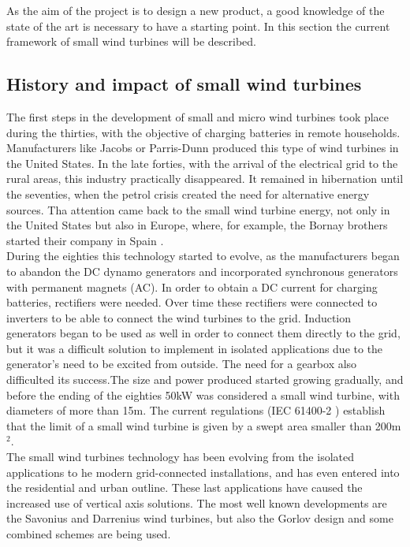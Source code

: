 \documentclass[../TFG_Report.tex]{subfiles}
\begin{document}
	
As the aim of the project is to design a new product, a good knowledge of the state of the art is necessary to have a starting point. In this section the current framework of small wind turbines will be described. 
	
\subsection{History and impact of small wind turbines}

The first steps in the development of small and micro wind turbines took place during the thirties, with the objective of charging batteries in remote households. Manufacturers like Jacobs \cite{Jacobs} or Parris-Dunn \cite{Parris} produced this type of wind turbines in the United States. In the late forties, with the arrival of the electrical grid to the rural areas, this industry practically disappeared. It remained in hibernation until the seventies, when the petrol crisis created the need for alternative energy sources. Tha attention came back to the small wind turbine energy, not only in the United States but also in Europe, where, for example, the Bornay brothers started their company in Spain \cite{Bornay}. \\

During the eighties this technology started to evolve, as the manufacturers began to abandon the DC dynamo generators and incorporated synchronous generators with permanent magnets (AC). In order to obtain a DC current for charging batteries, rectifiers were needed. Over time these rectifiers were connected to inverters to be able to connect the wind turbines to the grid. Induction generators began to be used as well in order to connect them directly to the grid, but it was a difficult solution to implement in isolated applications due to the generator's need to be excited from outside. The need for a gearbox also difficulted its success.The size and power produced started growing gradually, and before the ending of the eighties 50kW was considered a small wind turbine, with diameters of more than 15m. \cite{Sanz} The current regulations (IEC 61400-2 \cite{IEC}) establish that the limit of a small wind turbine is given by a swept area smaller than 200m$^2$. \\

The small wind turbines technology has been evolving from the isolated applications to he modern grid-connected installations, and has even entered into the residential and urban outline. These last applications have caused the increased use of vertical axis solutions. The most well known developments are the Savonius and Darrenius wind turbines, but also the Gorlov design and some combined schemes are being used. \cite{Sanz}  \\
\end{document}
